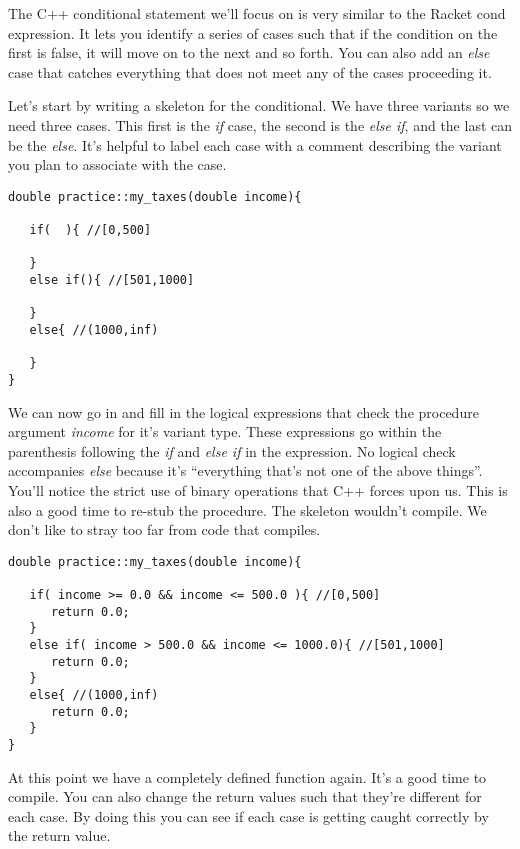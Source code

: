 \documentclass[]{tufte-handout}
\begin{document}
The C++ conditional statement we'll focus on is very similar to the Racket cond expression. It lets you identify a series of cases such that if the condition on the first is false, it will move on to the next and so forth. You can also add an \textit{else} case that catches everything that does not meet any of the cases proceeding it. 

Let's start by writing a skeleton for the conditional. We have three variants so we need three cases. This first is the \textit{if} case, the second is the \textit{else if}, and the last can be the \textit{else}. It's helpful to label each case with a comment describing the variant you plan to associate with the case.

\begin{verbatim}
double practice::my_taxes(double income){

   if(  ){ //[0,500]
   
   }
   else if(){ //[501,1000]
   
   }
   else{ //(1000,inf) 
   
   }
}
\end{verbatim}

We can now go in and fill in the logical expressions that check the procedure argument \textit{income} for it's variant type. These expressions go within the parenthesis following the \textit{if} and \textit{else if} in the expression. No logical check accompanies \textit{else} because it's ``everything that's not one of the above things''. You'll notice the strict use of binary operations that C++ forces upon us. This is also a good time to re-stub the procedure. The skeleton wouldn't compile. We don't like to stray too far from code that compiles.

\begin{verbatim}
double practice::my_taxes(double income){

   if( income >= 0.0 && income <= 500.0 ){ //[0,500]
      return 0.0;
   }
   else if( income > 500.0 && income <= 1000.0){ //[501,1000]
      return 0.0;   
   }
   else{ //(1000,inf) 
      return 0.0;   
   }
}
\end{verbatim}

At this point we have a completely defined function again. It's a good time to compile. You can also change the return values such that they're different for each case. By doing this you can see if each case is getting caught correctly by the return value.
\end{document}

